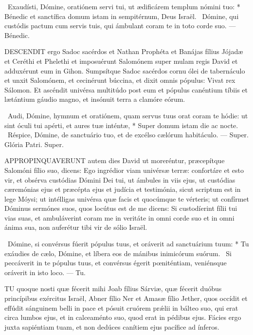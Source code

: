 \R\ Exaudísti, Dómine, oratiónem servi tui, ut ædificárem templum nómini tuo: * Bénedic et sanctífica domum istam in sempitérnum, Deus Israël. \V\ Dómine, qui custódis pactum cum servis tuis, qui ámbulant coram te in toto corde suo. --- Bénedic.



\lettrine[lines=2]{D}{ESCENDIT} ergo Sadoc sacérdos et Nathan Prophéta et Banájas fílius Jójadæ et Ceréthi et Phelethi et imposuérunt Salomónem super mulam regis David et adduxérunt eum in Gihon. Sumpsítque Sadoc sacérdos cornu ólei de tabernáculo et unxit Salomónem, et cecinérunt búccina, et dixit omnis pópulus: Vivat rex Sálomon. Et ascéndit univérsa multitúdo post eum et pópulus canéntium tíbiis et lætántium gáudio magno, et insónuit terra a clamóre eórum.

\R\ Audi, Dómine, hymnum et oratiónem, quam servus tuus orat coram te hódie: ut sint óculi tui apérti, et aures tuæ inténtæ, * Super domum istam die ac nocte. \V\ Réspice, Dómine, de sanctuário tuo, et de excélso cælórum habitáculo. --- Super. Glória Patri. Super.




\lettrine[lines=2]{A}{PPROPINQUAVERUNT} autem dies David ut moreréntur, præcepítque Salomóni fílio suo, dicens: Ego ingrédior viam univérsæ terræ: confortáre et esto vir, et obsérva custódias Dómini Dei tui, ut ámbules in viis ejus, ut custódias cæremónias ejus et præcépta ejus et judícia et testimónia, sicut scriptum est in lege Móysi; ut intélligas univérsa quæ facis et quocúmque te vérteris; ut confírmet Dóminus sermónes suos, quos locútus est de me dicens: Si custodíerint fílii tui vias suas, et ambuláverint coram me in veritáte in omni corde suo et in omni ánima sua, non auferétur tibi vir de sólio Israël.

\R\ Dómine, si convérsus fúerit pópulus tuus, et oráverit ad sanctuárium tuum: * Tu exáudies de cælo, Dómine, et líbera eos de mánibus inimicórum suórum. \V\ Si peccáverit in te pópulus tuus, et convérsus égerit pœniténtiam, veniénsque oráverit in isto loco. --- Tu.


\lettrine[lines=2]{T}{U} quoque nosti quæ fécerit mihi Joab fílius Sárviæ, quæ fécerit duóbus princípibus exércitus Israël, Abner fílio Ner et Amasæ fílio Jether, quos occídit et effúdit sánguinem belli in pace et pósuit cruórem prǽlii in bálteo suo, qui erat circa lumbos ejus, et in calceaménto suo, quod erat in pédibus ejus. Fácies ergo juxta sapiéntiam tuam, et non dedúces canítiem ejus pacífice ad ínferos.

